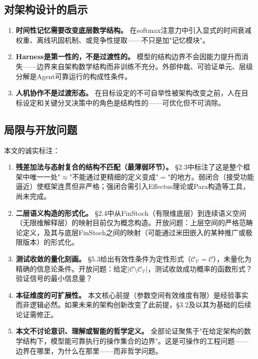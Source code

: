 \documentclass[11pt,a4paper]{ctexart}
\begin{document}
\subsection{对架构设计的启示}

\begin{enumerate}[leftmargin=*]
    \item \textbf{时间性记忆需要改变底层数学结构。} 在softmax注意力中引入显式的时间衰减权重、离线巩固机制、或竞争性提取——不只是加"记忆模块"。
    \item \textbf{Harness是第一性的，不是过渡性的。} 模型的结构边界不会因能力提升而消失——边界来自架构数学结构而非训练不充分。外部仲裁、可验证单元、层级分解是Agent可靠运行的构成性条件。
    \item \textbf{人机协作不是过渡形态。} 在目标设定的不可自举性被架构改变之前，人在目标设定和关键分叉决策中的角色是结构性的——可优化但不可消除。
\end{enumerate}

\subsection{局限与开放问题}

本文的诚实标注：

\begin{enumerate}[leftmargin=*]
    \item \textbf{残差加法与态射复合的结构不匹配（最薄弱环节）。} §2.3中标注了这是整个框架中唯一一处"$\approx$"不能通过更精细的定义变成"$=$"的地方。弱闭合（接受功能逼近）使框架连贯但非严格；强闭合需引入Effectus理论\cite{Cho2015Effectus}或Para构造\cite{Fong2019Para}等工具，尚未完成。

    \item \textbf{二层语义构造的形式化。} §2.4中从FinStoch（有限维底层）到连续语义空间（无限维解释层）的映射目前仅为概念构造。开放问题：上层空间的严格范畴论定义，及其与底层FinStoch之间的映射（可能通过米田嵌入的某种推广或极限版本）的形式化。

    \item \textbf{测试收敛的量化刻画。} §5.3给出有效性条件为定性形式（$\mathcal{C}_{\mathcal{V}} = \mathcal{C}$），未量化为精确的信息论条件。开放问题：给定$|\mathcal{C} \setminus \mathcal{C}_{\mathcal{V}}|$，测试收敛成功概率的函数形式？验证信号的最小信息量？

    \item \textbf{本征维度的可扩展性。} 本文核心前提（参数空间有效维度有限）是经验事实而非逻辑必然。如果未来的架构创新改变了此前提，§3.2及以其为基础的后续论证需修正。

    \item \textbf{本文不讨论意识、理解或智能的哲学定义。} 全部论证聚焦于"在给定架构的数学结构下，模型能可靠执行的操作集合的边界"。这是可操作的工程问题——边界在哪里，为什么在那里——而非哲学问题。
\end{enumerate}
\end{document}
